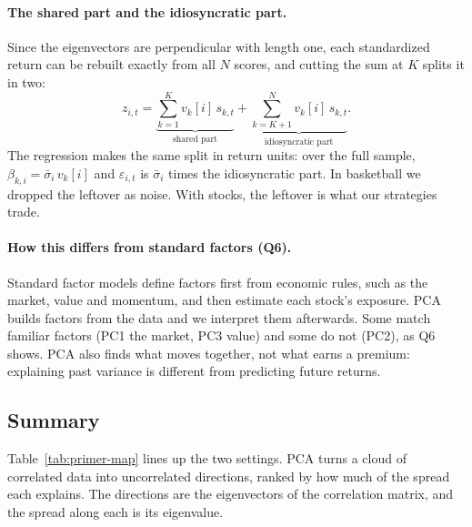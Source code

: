 \documentclass[12pt,letterpaper]{article}
\begin{document}
\paragraph{The shared part and the idiosyncratic part.} Since the
eigenvectors are perpendicular with length one, each standardized return
can be rebuilt exactly from all $N$ scores, and cutting the sum at $K$
splits it in two:
\[
z_{i,t}=
\underbrace{\sum_{k=1}^{K} v_k[i]\,s_{k,t}}_{\text{shared part}}
+\underbrace{\sum_{k=K+1}^{N} v_k[i]\,s_{k,t}}_{\text{idiosyncratic part}} .
\]
The regression makes the same split in return units: over the full
sample, $\beta_{k,i}=\bar\sigma_i\,v_k[i]$ and $\varepsilon_{i,t}$ is
$\bar\sigma_i$ times the idiosyncratic part. In basketball we dropped the
leftover as noise. With stocks, the leftover is what our strategies trade.

\paragraph{How this differs from standard factors (Q6).} Standard factor
models define factors first from economic rules, such as the market,
value and momentum, and then estimate each stock's exposure. PCA builds
factors from the data and we interpret them afterwards. Some match
familiar factors (PC1 the market, PC3 value) and some do not (PC2), as Q6
shows. PCA also finds what moves together, not what earns a premium:
explaining past variance is different from predicting future returns.

\subsection{Summary}
Table~\ref{tab:primer-map} lines up the two settings. PCA turns a cloud of
correlated data into uncorrelated directions, ranked by how much of the
spread each explains. The directions are the eigenvectors of the
correlation matrix, and the spread along each is its eigenvalue.
\end{document}
